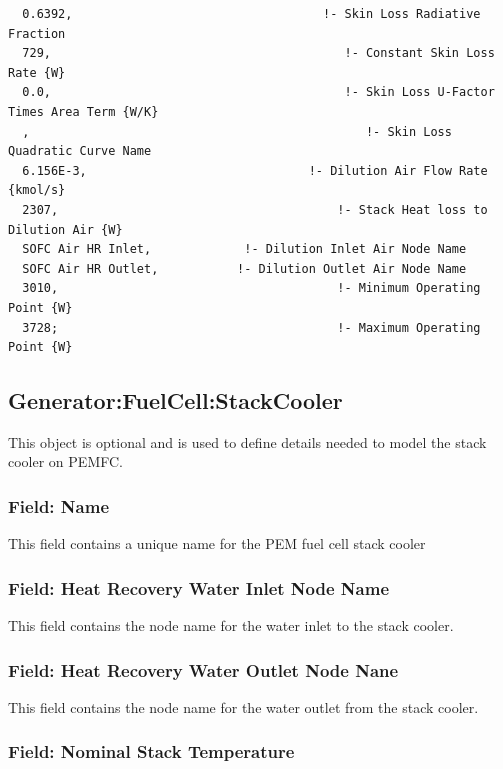 \begin{lstlisting}
  0.6392,                                   !- Skin Loss Radiative Fraction
  729,                                         !- Constant Skin Loss Rate {W}
  0.0,                                         !- Skin Loss U-Factor Times Area Term {W/K}
  ,                                               !- Skin Loss Quadratic Curve Name
  6.156E-3,                               !- Dilution Air Flow Rate {kmol/s}
  2307,                                       !- Stack Heat loss to Dilution Air {W}
  SOFC Air HR Inlet,             !- Dilution Inlet Air Node Name
  SOFC Air HR Outlet,           !- Dilution Outlet Air Node Name
  3010,                                       !- Minimum Operating Point {W}
  3728;                                       !- Maximum Operating Point {W}
\end{lstlisting}

\subsection{Generator:FuelCell:StackCooler}\label{generatorfuelcellstackcooler}

This object is optional and is used to define details needed to model the stack cooler on PEMFC.

\subsubsection{Field: Name}\label{field-name-15-001}

This field contains a unique name for the PEM fuel cell stack cooler

\subsubsection{Field: Heat Recovery Water Inlet Node Name}\label{field-heat-recovery-water-inlet-node-name-1}

This field contains the node name for the water inlet to the stack cooler.

\subsubsection{Field: Heat Recovery Water Outlet Node Nane}\label{field-heat-recovery-water-outlet-node-nane}

This field contains the node name for the water outlet from the stack cooler.

\subsubsection{Field: Nominal Stack Temperature}\label{field-nominal-stack-temperature}

